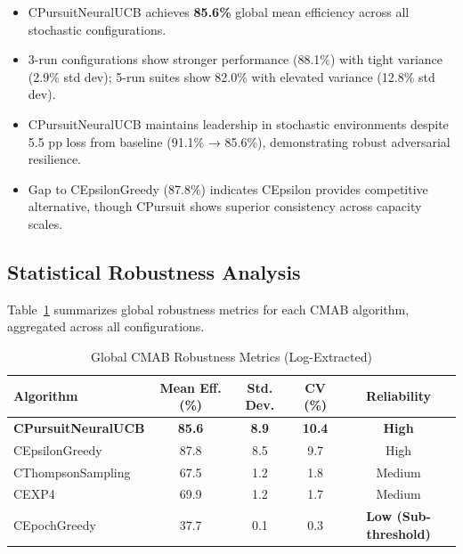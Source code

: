\documentclass[12pt,a4paper]{article}
\newcommand{\success}[1]{\textcolor{accentgreen}{\textbf{#1}}}
\newcommand{\warning}[1]{\textcolor{warningred}{\textbf{#1}}}
\begin{document}
\begin{tcolorbox}[colback=tableheader,colframe=primaryblue,title=\textbf{Primary Performance Results (Log-Extracted)}]
\begin{itemize}
    \item CPursuitNeuralUCB achieves \success{85.6\%} global mean efficiency across all stochastic configurations.
    \item 3-run configurations show stronger performance (88.1\%) with tight variance (2.9\% std dev); 5-run suites show 82.0\% with elevated variance (12.8\% std dev).
    \item CPursuitNeuralUCB maintains leadership in stochastic environments despite 5.5 pp loss from baseline (91.1\% → 85.6\%), demonstrating robust adversarial resilience.
    \item Gap to CEpsilonGreedy (87.8\%) indicates CEpsilon provides competitive alternative, though CPursuit shows superior consistency across capacity scales.
\end{itemize}

\end{tcolorbox}

\subsection{Statistical Robustness Analysis}

Table~\ref{tab:robustness} summarizes global robustness metrics for each CMAB algorithm, aggregated across all configurations.

\begin{table}[H]
\centering
\caption{Global CMAB Robustness Metrics (Log-Extracted)}
\label{tab:robustness}
\begin{tabular}{@{}lcccc@{}}
\toprule
\textbf{Algorithm} & \textbf{Mean Eff. (\%)} & \textbf{Std. Dev.} & \textbf{CV (\%)} & \textbf{Reliability} \\
\midrule
\success{CPursuitNeuralUCB} & \success{85.6} & \success{8.9} & \success{10.4} & \success{High} \\
CEpsilonGreedy              & 87.8          & 8.5          & 9.7          & High \\
CThompsonSampling           & 67.5          & 1.2          & 1.8          & Medium \\
CEXP4                       & 69.9          & 1.2          & 1.7          & Medium \\
CEpochGreedy                & 37.7          & 0.1          & 0.3          & \warning{Low (Sub-threshold)} \\
\bottomrule
\end{tabular}
\end{table}
\end{document}
